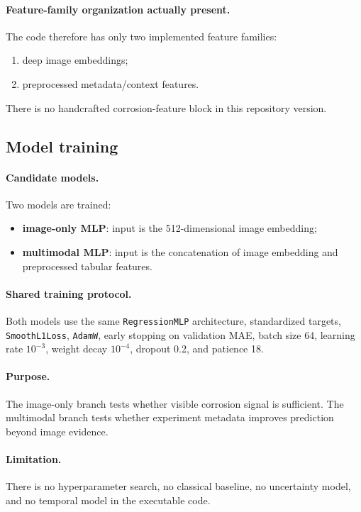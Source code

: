 \documentclass[11pt]{article}
\begin{document}
\paragraph{Feature-family organization actually present.}
The code therefore has only two implemented feature families:
\begin{enumerate}
  \item deep image embeddings;
  \item preprocessed metadata/context features.
\end{enumerate}
There is no handcrafted corrosion-feature block in this repository version.

\subsection{Model training}
\paragraph{Candidate models.}
Two models are trained:
\begin{itemize}
  \item \textbf{image-only MLP}: input is the 512-dimensional image embedding;
  \item \textbf{multimodal MLP}: input is the concatenation of image embedding and preprocessed tabular features.
\end{itemize}

\paragraph{Shared training protocol.}
Both models use the same \texttt{RegressionMLP} architecture, standardized targets, \texttt{SmoothL1Loss}, \texttt{AdamW}, early stopping on validation MAE, batch size 64, learning rate \(10^{-3}\), weight decay \(10^{-4}\), dropout 0.2, and patience 18.

\paragraph{Purpose.}
The image-only branch tests whether visible corrosion signal is sufficient. The multimodal branch tests whether experiment metadata improves prediction beyond image evidence.

\paragraph{Limitation.}
There is no hyperparameter search, no classical baseline, no uncertainty model, and no temporal model in the executable code.
\end{document}
